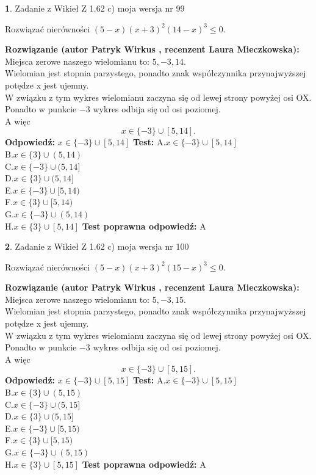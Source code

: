 \documentclass[12pt, a4paper]{article}
\theoremstyle{definition} %
\newtheorem{zad}{}
\newcommand{\zadStart}[1]{\begin{zad}#1\newline}
\newcommand{\zadStop}{\end{zad}}
\newcommand{\rozwStart}[2]{\noindent \textbf{Rozwiązanie (autor #1 , recenzent #2): }\newline}
\newcommand{\rozwStop}{\newline}
\newcommand{\odpStart}{\noindent \textbf{Odpowiedź:}\newline}
\newcommand{\odpStop}{\newline}
\newcommand{\testStart}{\noindent \textbf{Test:}\newline}
\newcommand{\testStop}{\newline}
\newcommand{\kluczStart}{\noindent \textbf{Test poprawna odpowiedź:}\newline}
\newcommand{\kluczStop}{\newline}
\begin{document}
\zadStart{Zadanie z Wikieł Z 1.62 c) moja wersja nr 99}

Rozwiązać nierówności $(5-x)(x+3)^{2}(14-x)^{3}\le0$.
\zadStop
\rozwStart{Patryk Wirkus}{Laura Mieczkowska}
Miejsca zerowe naszego wielomianu to: $5, -3, 14$.\\
Wielomian jest stopnia parzystego, ponadto znak współczynnika przy\linebreak najwyższej potędze x jest ujemny.\\ W związku z tym wykres wielomianu zaczyna się od lewej strony powyżej osi OX.\\
Ponadto w punkcie $-3$ wykres odbija się od osi poziomej.\\
A więc $$x \in \{-3\} \cup [5,14].$$
\rozwStop
\odpStart
$x \in \{-3\} \cup [5,14]$
\odpStop
\testStart
A.$x \in \{-3\} \cup [5,14]$\\
B.$x \in \{3\} \cup (5,14)$\\
C.$x \in \{-3\} \cup (5,14]$\\
D.$x \in \{3\} \cup (5,14]$\\
E.$x \in \{-3\} \cup [5,14)$\\
F.$x \in \{3\} \cup [5,14)$\\
G.$x \in \{-3\} \cup (5,14)$\\
H.$x \in \{3\} \cup [5,14]$
\testStop
\kluczStart
A
\kluczStop



\zadStart{Zadanie z Wikieł Z 1.62 c) moja wersja nr 100}

Rozwiązać nierówności $(5-x)(x+3)^{2}(15-x)^{3}\le0$.
\zadStop
\rozwStart{Patryk Wirkus}{Laura Mieczkowska}
Miejsca zerowe naszego wielomianu to: $5, -3, 15$.\\
Wielomian jest stopnia parzystego, ponadto znak współczynnika przy\linebreak najwyższej potędze x jest ujemny.\\ W związku z tym wykres wielomianu zaczyna się od lewej strony powyżej osi OX.\\
Ponadto w punkcie $-3$ wykres odbija się od osi poziomej.\\
A więc $$x \in \{-3\} \cup [5,15].$$
\rozwStop
\odpStart
$x \in \{-3\} \cup [5,15]$
\odpStop
\testStart
A.$x \in \{-3\} \cup [5,15]$\\
B.$x \in \{3\} \cup (5,15)$\\
C.$x \in \{-3\} \cup (5,15]$\\
D.$x \in \{3\} \cup (5,15]$\\
E.$x \in \{-3\} \cup [5,15)$\\
F.$x \in \{3\} \cup [5,15)$\\
G.$x \in \{-3\} \cup (5,15)$\\
H.$x \in \{3\} \cup [5,15]$
\testStop
\kluczStart
A
\kluczStop
\end{document}
